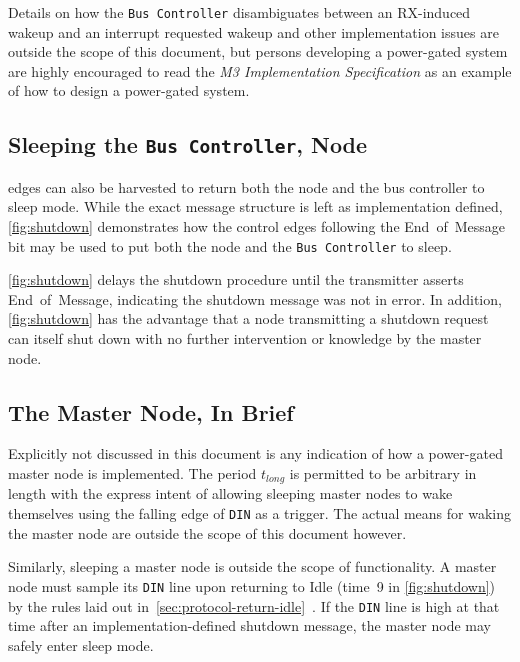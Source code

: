 Details on how the {\tt Bus~Controller} disambiguates between an RX-induced
wakeup and an interrupt requested wakeup and other implementation issues are
outside the scope of this document, but persons developing a power-gated
system are highly encouraged to read the {\em \bus M3 Implementation
Specification} as an example of how to design a power-gated system.

\begin{figure}
  \figTimingInducedGlitch
\end{figure}

\subsection{Sleeping the {\tt Bus Controller}, Node}
\bus edges can also be harvested to return both the node and the bus
controller to sleep mode. While the exact message structure is left as
implementation defined, \autoref{fig:shutdown} demonstrates how the control
edges following the End~of~Message bit may be used to put both the node and
the {\tt Bus~Controller} to sleep.

\autoref{fig:shutdown} delays the shutdown procedure until the transmitter
asserts End~of~Message, indicating the shutdown message was not in error.
In addition, \autoref{fig:shutdown} has the advantage that a node transmitting
a shutdown request can itself shut down with no further intervention or
knowledge by the master node.

\begin{figure}
  \figTimingShutdown
\end{figure}

\subsection{The Master Node, In Brief}
Explicitly not discussed in this document is any indication of how a
power-gated master node is implemented. The period $t_{long}$ is permitted to
be arbitrary in length with the express intent of allowing sleeping master
nodes to wake themselves using the falling edge of {\tt DIN} as a trigger. The
actual means for waking the master node are outside the scope of this
document however.

Similarly, sleeping a master node is outside the scope of \bus functionality.
A master node must sample its {\tt DIN} line upon returning to Idle (time~9
in \autoref{fig:shutdown}) by the rules laid out
in~\ref{sec:protocol-return-idle}~. If the
{\tt DIN} line is high at that time after an implementation-defined shutdown
message, the master node may safely enter sleep mode.
